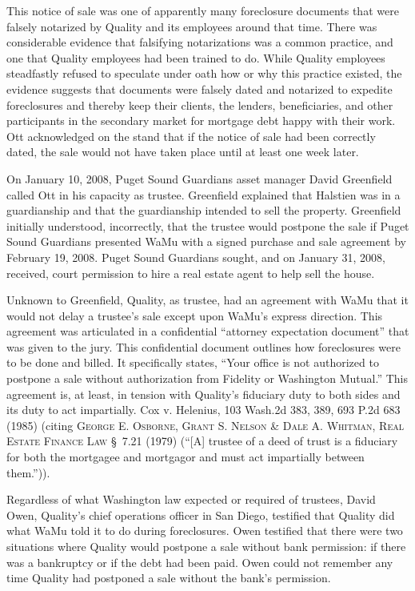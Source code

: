 This notice of sale was one of apparently many foreclosure documents
that were falsely notarized by Quality and its employees around that time.
There was considerable evidence that falsifying notarizations was a common
practice, and one that Quality employees had been trained to do. While Quality
employees steadfastly refused to speculate under oath how or why this practice
existed, the evidence suggests that documents were falsely dated and notarized
to expedite foreclosures and thereby keep their clients, the lenders,
beneficiaries, and other participants in the secondary market for mortgage debt
happy with their work. Ott acknowledged on the stand that if the notice of sale
had been correctly dated, the sale would not have taken place until at least
one week later.

On January 10, 2008, Puget Sound Guardians asset manager David
Greenfield called Ott in his capacity as trustee. Greenfield explained that
Halstien was in a guardianship and that the guardianship intended to sell the
property. Greenfield initially understood, incorrectly, that the trustee would
postpone the sale if Puget Sound Guardians presented WaMu with a signed
purchase and sale agreement by February 19, 2008. Puget Sound Guardians sought,
and on January 31, 2008, received, court permission to hire a real estate agent
to help sell the house.

Unknown to Greenfield, Quality, as trustee, had an agreement with WaMu
that it would not delay a trustee's sale except upon WaMu's express direction.
This agreement was articulated in a confidential ``attorney expectation
document'' that was given to the jury. This confidential document outlines how
foreclosures were to be done and billed. It specifically states, ``Your office
is not authorized to postpone a sale without authorization from Fidelity or
Washington Mutual.'' This agreement is, at least, in tension with Quality's
fiduciary duty to both sides and its duty to act impartially. Cox v. Helenius,
103 Wash.2d 383, 389, 693 P.2d 683 (1985) (citing \textsc{George E. Osborne, Grant S.
Nelson \& Dale A. Whitman, Real Estate Finance Law} \S~7.21 (1979) (``[A]
trustee of a deed of trust is a fiduciary for both the mortgagee and mortgagor
and must act impartially between them.'')).

Regardless of what Washington law expected or required of trustees,
David Owen, Quality's chief operations officer in San Diego, testified that
Quality did what WaMu told it to do during foreclosures. Owen testified that
there were two situations where Quality would postpone a sale without bank
permission: if there was a bankruptcy or if the debt had been paid. Owen could
not remember any time Quality had postponed a sale without the bank's
permission.

